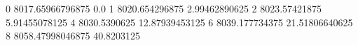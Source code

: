 0 8017.65966796875 0.0
1 8020.654296875 2.99462890625
2 8023.57421875 5.91455078125
4 8030.5390625 12.87939453125
6 8039.177734375 21.51806640625
8 8058.47998046875 40.8203125
